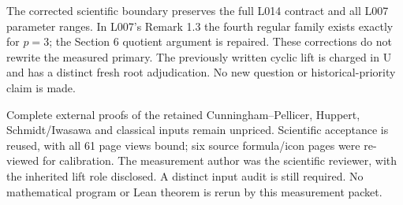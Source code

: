 \documentclass[a4paper,11pt]{article}
\begin{document}
The corrected scientific boundary preserves the full L014 contract and all
L007 parameter ranges. In L007's Remark 1.3 the fourth regular family exists
exactly for $p=3$; the Section 6 quotient argument is repaired. These corrections
do not rewrite the measured primary. The previously written cyclic lift is
charged in U and has a distinct fresh root adjudication. No new question or
historical-priority claim is made.

Complete external proofs of the retained Cunningham--Pellicer, Huppert,
Schmidt/Iwasawa and classical inputs remain unpriced. Scientific acceptance
is reused, with all 61 page views bound; six source formula/icon pages were
re-viewed for calibration. The measurement author was the scientific reviewer,
with the inherited lift role disclosed. A distinct input audit is still required.
No mathematical program or Lean theorem is rerun by this measurement packet.
\end{document}
